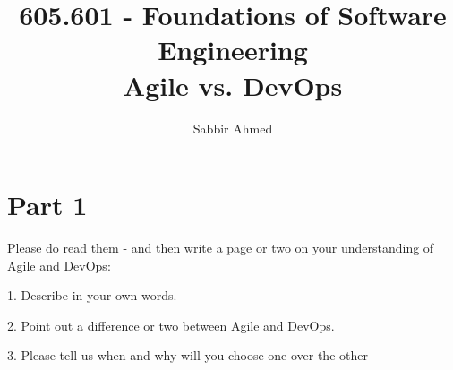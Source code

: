 \documentclass{article}
\begin{document}
  \title{605.601 - Foundations of Software Engineering \\ Agile vs. DevOps}
  \author{Sabbir Ahmed}

  \maketitle

  \section*{Part 1} Please do read them - and then write a page or two on your understanding of Agile and DevOps:

1. Describe in your own words.

2. Point out a difference or two between Agile and DevOps.

3. Please tell us when and why will you choose one over the other
\end{document}
